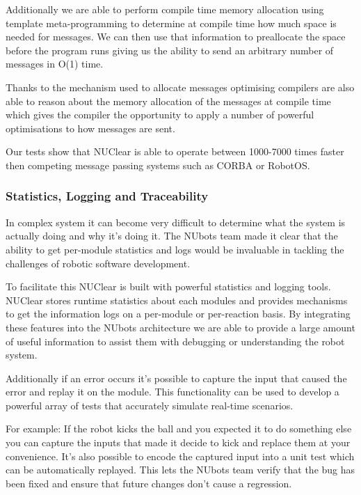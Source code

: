 \documentclass[english,12pt]{scrartcl}
\begin{document}
				Additionally we are able to perform compile time memory allocation using template meta-programming to determine at compile time how much space is needed for messages.
				We can then use that information to preallocate the space before the program runs giving us the ability to send an arbitrary number of messages in O(1) time.
			
				Thanks to the mechanism used to allocate messages optimising compilers are also able to reason about the memory allocation of the messages at compile time which gives the compiler the opportunity to apply a number of powerful optimisations to how messages are sent.
				
				Our tests show that NUClear is able to operate between 1000-7000 times faster then competing message passing systems such as CORBA or RobotOS.
				
			\subsubsection{Statistics, Logging and Traceability}
				In complex system it can become very difficult to determine what the system is actually doing and why it's doing it. 
				The NUbots team made it clear that the ability to get per-module statistics and logs would be invaluable in tackling the challenges of robotic software development.
				
				To facilitate this NUClear is built with powerful statistics and logging tools.
				NUClear stores runtime statistics about each modules and provides mechanisms to get the information logs on a per-module or per-reaction basis. 
				By integrating these features into the NUbots architecture we are able to provide a large amount of useful information to assist them with debugging or understanding the robot system. 
				
				Additionally if an error occurs it's possible to capture the input that caused the error and replay it on the module. 
				This functionality can be used to develop a powerful array of tests that accurately simulate real-time scenarios.
				
				For example: If the robot kicks the ball and you expected it to do something else you can capture the inputs that made it decide to kick and replace them at your convenience. 
				It's also possible to encode the captured input into a unit test which can be automatically replayed. 
				This lets the NUbots team verify that the bug has been fixed and ensure that future changes don't cause a regression.
		
\end{document}
